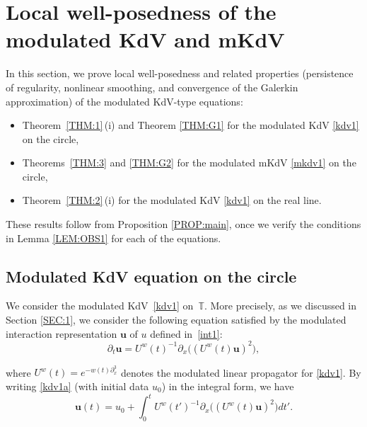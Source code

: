 \documentclass[letterpaper, 11pt,  reqno]{amsart}
\newcommand{\1}{\hspace{0.5mm}\text{I}\hspace{0.5mm}}
\newcommand{\noi}{\noindent}
\newcommand{\T}{\mathbb{T}}
\newcommand{\dx}{\partial_x}
\newcommand{\dt}{\partial_t}
\newcommand{\uw}{U^w}
\newcommand{\uu}{\mathbf{u}}
\numberwithin{equation}{section}
\numberwithin{theorem}{section}
\begin{document}
\section{Local well-posedness
of the modulated KdV and mKdV}
\label{SEC:LWP}

In this section, we prove local well-posedness
and related properties
(persistence of regularity, nonlinear smoothing,  and convergence of the Galerkin approximation)
of the modulated KdV-type equations:

\smallskip

\begin{itemize}
\item
Theorem~\ref{THM:1}\,(i) and Theorem \ref{THM:G1} 
for the modulated 
KdV \eqref{kdv1}
on the circle, 


\smallskip

\item 
Theorems~\ref{THM:3} and \ref{THM:G2}
for the modulated 
mKdV \eqref{mkdv1}
on the circle, 


\smallskip

\item 
Theorem~\ref{THM:2}\,(i)
for  the modulated KdV \eqref{kdv1}
on the real line.

\end{itemize}

\smallskip


\noi
These results follow
from 
Proposition \ref{PROP:main}, 
once we verify the conditions
in 
Lemma \ref{LEM:OBS1}
for each of the equations.

 


\subsection{Modulated KdV equation on the circle}
\label{SUBSEC:K1}
We consider the  modulated KdV~\eqref{kdv1} on~$\T$.
More precisely, as we discussed in Section \ref{SEC:1},
we consider the following equation satisfied by 
the modulated interaction representation $\uu$
of $u$ defined in~\eqref{int1}:
\begin{equation}
\dt \uu = \uw(t)^{-1} \dx\big( (\uw(t) \uu)^2\big), 
\label{kdv1a}
\end{equation}

\noi
where 
$\uw (t)=e^{-   w(t)\dx^3}  $
denotes the modulated linear propagator for \eqref{kdv1}.
By writing \eqref{kdv1a} (with initial data $u_0$) in the integral form, we have
\begin{equation}
\uu(t) = u_0 + \int_0 ^t \uw(t')^{-1}
\dx\big( (\uw(t) \uu)^2\big)dt'.
\label{mild3x}
\end{equation}
\end{document}
